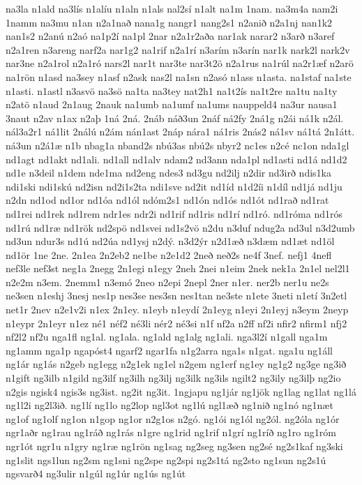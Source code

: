 {na3la
n1ald
na3lís
n1alíu
n1aln
n1als
nal2sí
n1alt
na1m
1nam.
na3m4a
nam2i
1namm
na3mu
n1an
n2a1nað
nana1g
nangr1
nang2s1
n2anið
n2a1nj
nan1k2
nan1s2
n2anú
n2aó
na1p2í
na1pl
2nar
n2a1r2aða
nar1ak
narar2
n3arð
n3aref
n2a1ren
n3areng
narf2a
nar1g2
na1rif
n2a1rí
n3arím
n3arín
nar1k
nark2l
nark2v
nar3ne
n2a1rol
n2a1ró
nars2l
nar1t
nar3te
nar3t2ö
n2a1rus
na1rúl
na2r1æf
n2arö
na1rön
n1asd
na3sey
n1asf
n2ask
nas2l
na1sn
n2asó
n1ass
n1asta.
na1staf
na1ste
n1asti.
n1astl
n3asvö
na3sö
na1ta
na3tey
nat2h1
na1t2ís
na1t2re
na1tu
na1ty
n2atö
n1aud
2n1aug
2nauk
na1umb
na1umf
na1ums
nauppeld4
na3ur
nausa1
3naut
n2av
n1ax
n2aþ
1ná
2ná.
2náb
náð3un
2náf
ná2fy
2ná1g
n2ái
ná1k
n2ál.
nál3a2r1
ná1lit
2nálú
n2ám
nán1ast
2náp
nára1
ná1ris
2nás2
ná1sv
ná1tá
2n1átt.
ná3un
n2á1æ
n1b
nbag1a
nband2s
nbú3as
nbú2s
nbyr2
nc1es
n2cé
nc1on
nda1gl
nd1agt
nd1akt
nd1ali.
nd1all
nd1alv
ndam2
nd3ann
nda1pl
nd1asti
nd1á
nd1d2
nd1e
n3deil
n1dem
nde1ma
nd2eng
ndes3
nd3gu
nd2ilj
n2dir
nd3irð
ndis1ka
ndi1ski
ndi1skú
nd2isn
nd2i1s2ta
ndi1sve
nd2it
nd1íd
n1d2íi
n1díl
nd1já
nd1ju
n2dn
nd1od
nd1or
nd1óa
nd1ól
ndóm2s1
nd1ón
nd1ós
nd1ót
nd1rað
nd1rat
nd1rei
nd1rek
nd1rem
ndr1es
ndr2i
nd1rif
nd1ris
nd1rí
nd1ró.
nd1róma
nd1rós
nd1rú
nd1ræ
nd1rök
nd2spö
nd1svei
nd1s2vö
n2du
n3duf
ndug2a
nd3ul
n3d2umb
nd3un
ndur3s
nd1ú
nd2úa
nd1ysj
n2dý.
n3d2ýr
n2d1æð
n3dæm
nd1æt
nd1öl
nd1ör
1ne
2ne.
2n1ea
2n2eb2
ne1be
n2e1d2
2neð
neð2s
ne4f
3nef.
nefj1
4nefl
nef3le
nef3st
neg1a
2negg
2n1egi
n1egy
2neh
2nei
n1eim
2nek
nek1a
2n1el
nel2l1
n2e2m
n3em.
2nemm1
n3emó
2neo
n2epi
2nepl
2ner
n1er.
ner2b
ner1u
ne2s
ne3sen
n1eshj
3nesj
nes1p
nes3se
nes3sn
nes1tan
ne3ste
n1ete
3neti
n1etí
3n2etl
net1r
2nev
n2e1v2i
n1ex
2n1ey.
n1eyb
n1eydí
2n1eyg
n1eyi
2n1eyj
n3eym
2neyp
n1eypr
2n1eyr
n1ez
né1
néf2
né3li
nér2
né3si
n1f
nf2a
n2ff
nf2i
nfir2
nfirm1
nfj2
nf2l2
nf2u
nga1fl
ng1al.
ng1ala.
ng1ald
ng1alg
ng1ali.
nga3l2í
n1gall
nga1m
ng1amm
nga1p
ngapóst4
ngarf2
ngar1fa
n1g2arra
nga1s
n1gat.
nga1u
ng1áll
ng1ár
ng1ás
n2geb
ng1egg
n2g1ek
ng1el
n2gem
ng1erf
ng1ey
ng1g2
ng3ge
ng3ið
n1gift
ng3ilb
n1gild
ng3ilf
ng3ilh
ng3ilj
ng3ilk
ng3ils
ngilt2
ng3ily
ng3ilþ
ng2io
n2gis
ngisk4
ngis3s
ng3ist.
ng2it
ng3it.
1ngjapu
ng1jár
ng1jök
ng1lag
ng1lat
ng1lá
ng1l2i
ng2l3ið.
ng1lí
ng1lo
ng2lop
ngl3ot
ng1lú
ngl1æð
ng1nið
ng1nó
ng1næt
ng1of
ng1olf
ng1on
n1gop
ng1or
n2g1os
n2gó.
ng1ói
ng1ól
ng2ól.
ng2óla
ng1ór
ngr1aðr
ng1rau
ng1ráð
ng1rás
n1gre
ng1rid
ng1rif
n1grí
ng1ríð
ng1ro
ng1róm
ngr1ót
ngr1u
n1gry
ng1ræ
ng1rön
ng1sag
ng2seg
ng3sen
ng2sé
ng2s1kaf
ng3ski
ng1slit
ngs1lun
ng2sm
ng1sni
ng2spe
ng2spi
ng2s1tá
ng2sto
ng1sun
ng2s1ú
ngsvarð4
ng3ulir
n1gúl
ng1úr
ng1ús
ng1út
}
